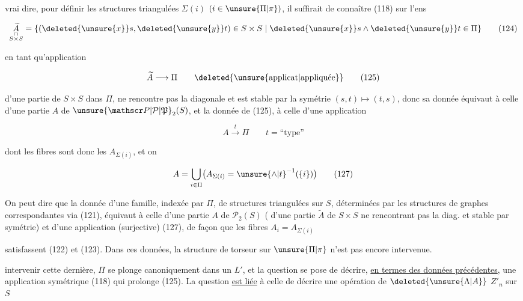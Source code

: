 
 vrai dire, pour définir les structures triangulées $\Sigma(i)$ $(i\in\unsure{\Pi|\pi})$, il suffirait de connaître (118) sur l'ens

\[
\underset{\substack{\cap\\ S\times S}}{\widetilde A}
=\{(\deleted{\unsure{x}}s,\deleted{\unsure{y}}t)\in S\times S\mid \deleted{\unsure{x}}s\mathbin{\wedge}\deleted{\unsure{y}}t\in\Pi\}
\tag*{(124)}
\]

en tant qu'application

\[
\widetilde A\longrightarrow\Pi\qquad\deleted{\text{\unsure{applicat|appliquée}}}
\tag*{(125)}
\]

d'une partie  de $S\times S$ dans $\Pi$,     ne rencontre pas la diagonale et est  stable par la symétrie $(s,t)\mapsto(t,s)$, donc sa donnée équivaut à celle d'une partie $A$ de $\unsure{\mathscr P|\mathcal P|\mathfrak P}_2(S)$, et la donnée de (125),  à celle d'une application

\[
 A\xrightarrow{t}\Pi\qquad t=\text{``type''}
 \tag*{(126)}
\]

dont les fibres sont donc les $A_{\Sigma(i)}$, et on 

\[
 A=\bigcup_{i\in\Pi}\bigl(A_{\Sigma(i)}={\unsure{\wedge|t}}^{-1}(\{i\})\bigr)
 \tag*{(127)}
\]

On peut dire que la donnée d'une famille, indexée par $\Pi$, de structures triangulées sur $S$, déterminées par les structures de graphes correspondantes via (121), équivaut à celle d'une partie $A$ de $\mathscr P_2(S)$ ( d'une partie $\widetilde A$ de $S\times S$ ne rencontrant pas la diag. et stable par symétrie) et d'une application (surjective) (127), de façon que les fibres $A_i=A_{\Sigma(i)}$


satisfassent (122) et (123). Dans ces données, la structure de torseur sur $\unsure{\Pi|\pi}$ n'est pas encore intervenue.

  intervenir cette dernière, $\Pi$ se plonge canoniquement dans un $L'$, et la question se pose de décrire, \uline{en termes des données précédentes}, une application symétrique (118) qui prolonge (125). La question \uline{est liée} à celle de décrire une opération de $\deleted{\unsure{\Lambda|A}}$ $Z'_n$ sur $S$

